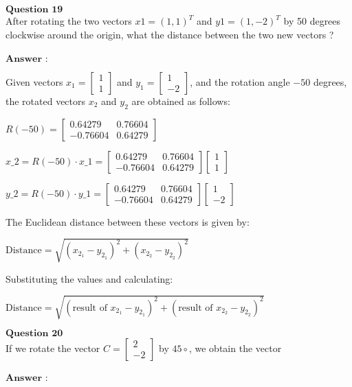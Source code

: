 \documentclass[11pt]{article}
\begin{document}
    $\textbf{Question 19}$\\
After rotating the two vectors $x1=(1,1)^T$ and $y1=(1,−2)^T$ by 50
degrees clockwise around the origin, what the distance between the two
new vectors ?\\
~\\
$\textbf{Answer :}$

    Given vectors $x_1 = \begin{bmatrix}1 \\ 1\end{bmatrix}$ and
$y_1 = \begin{bmatrix}1 \\ -2\end{bmatrix}$, and the rotation angle
$-50$ degrees, the rotated vectors $x_2$ and $y_2$ are obtained as
follows:

$ R(-50) =
\begin{bmatrix}
0.64279 & 0.76604 \\
-0.76604 & 0.64279
\end{bmatrix}
$

$ x\_2 = R(-50) \cdot x\_1 =
\begin{bmatrix}
0.64279 & 0.76604 \\
-0.76604 & 0.64279
\end{bmatrix}
\begin{bmatrix}
1 \\
1
\end{bmatrix}
$

$ y\_2 = R(-50) \cdot y\_1 =
\begin{bmatrix}
0.64279 & 0.76604 \\
-0.76604 & 0.64279
\end{bmatrix}
\begin{bmatrix}
1 \\
-2
\end{bmatrix}
$

The Euclidean distance between these vectors is given by:

$ \text{Distance} =
\sqrt{(x_{2_1} - y_{2_1})^2 + (x_{2_2} - y_{2_2})^2} $

Substituting the values and calculating:

$ \text{Distance} =
\sqrt{(\text{result of } x_{2_1} - y_{2_1})^2 + (\text{result of } x_{2_2} - y_{2_2})^2}
$

    $\textbf{Question 20}$\\
If we rotate the vector $C=\begin{bmatrix} 2 \\ -2 \end{bmatrix}$ by
$45∘$, we obtain the vector\\
~\\
$\textbf{Answer :}$
\end{document}
